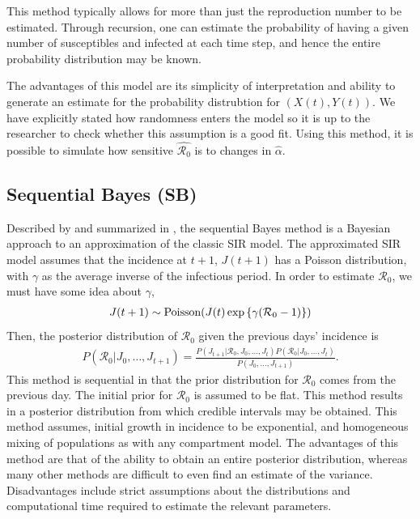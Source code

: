 \documentclass[12pt]{article}
\newcommand{\rr}{\ensuremath{\mathcal{R}_0}}
\begin{document}
This method typically allows for more than just the reproduction number to be estimated.  Through recursion, one can estimate the probability of having a given number of susceptibles and infected at each time step, and hence the entire probability distribution may be known.

The advantages of this model are its simplicity of interpretation and ability to generate an estimate for the probability distrubtion for $(X(t), Y(t))$.  We have explicitly stated how randomness enters the model so it is up to the researcher to check whether this assumption is a good fit.  Using this method, it is possible to simulate how sensitive $\hat{\rr}$ is to changes in $\hat{\alpha}$.





\subsection{Sequential Bayes (SB)}\label{sec:seqbayes}

Described by \cite{bettencourt2008} and summarized in \cite{obadia2012r0}, the sequential Bayes method is a Bayesian approach to an approximation of the classic SIR model.  The approximated SIR model assumes that the incidence at $t+1$, $J(t+1)$ has a Poisson distribution, with $\gamma$ as the  average inverse of the infectious period. In order to estimate $\rr$, we must have some idea about $\gamma$,
\begin{align*}
J(t+1)  \sim \textnormal{Poisson}( J(t) \exp \left \{  \gamma (\rr-1)\right \})
\end{align*}
Then, the posterior distribution of $\rr$ given the previous days' incidence is
\begin{align*}
  P(\rr | J_0, \dots, J_{t+1}) = \frac{P(J_{t+1} | \rr, J_0, \dots, J_t)P(\rr| J_0, \dots, J_t)}{P(J_0, \dots, J_{t+1})}.
\end{align*}
This method is sequential in that the prior distribution for $\rr$ comes from the previous day.  The initial prior for $\rr$ is assumed to be flat.  This method results in a posterior distribution from which credible intervals may be obtained.  This method assumes, initial growth in incidence to be exponential, and homogeneous mixing of populations as with any compartment model.  The advantages of this method are that of the ability to obtain an entire posterior distribution, whereas many other methods are difficult to even find an estimate of the variance.  Disadvantages include strict assumptions about the distributions and computational time required to estimate the relevant parameters.
\end{document}
